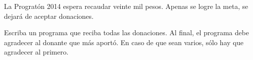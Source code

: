 La Progratón 2014 espera recaudar veinte mil pesos.
Apenas se logre la meta,
se dejará de aceptar donaciones.

Escriba un programa que reciba todas las donaciones.
Al final,
el programa debe agradecer
al donante que más aportó.
En caso de que sean varios,
sólo hay que agradecer al primero.

\begin{minipage}[t]{.60\textwidth}
  
\end{minipage}
